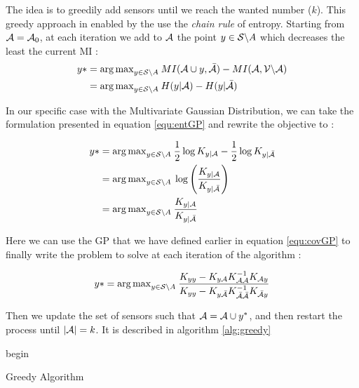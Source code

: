 \documentclass[12pt,twoside]{report}
\begin{document}
 
 The idea is to greedily add sensors until we reach the wanted number ($k$).   This greedy approach in enabled by the use the \textit{chain rule} of entropy.  Starting from $\A = \A_0$, at each iteration we add to $\A$ the point $y \in \S \backslash A $ which decreases the least the current MI : 
\begin{align}
	y* &= {\arg \max}_{y \in \S \backslash A } \: MI(\A \cup y, \bar{\A} ) - MI(\A, \VA) \\
	&= {\arg \max}_{y \in \S \backslash A } \: H(y | \A ) - H(y | \bar{\A} )
\end{align}

In our specific case with the Multivariate Gaussian Distribution, we can take the formulation presented in equation \ref{equ:entGP} and rewrite the objective to : 

\begin{align}
	y*  &= {\arg \max}_{y \in \S \backslash A } \: \frac{1}{2} \log K_{y | \A} - \frac{1}{2} \log K_{y | \bar{\A}} \\
	&= {\arg \max}_{y \in \S \backslash A } \: \log \left(\frac{K_{y | \A}}{K_{y | \bar{\A}}} \right) \\
	&= {\arg \max}_{y \in \S \backslash A } \: \frac{K_{y | \A}}{K_{y | \bar{\A}}}
\end{align}

Here we can use the GP that we have defined earlier in equation \ref{equ:covGP} to finally write the problem to solve at each iteration of the algorithm : 

\begin{equation}
	y*  = {\arg \max}_{y \in \S \backslash A } \: \frac{K_{yy} - K_{y\A} K_{\A\A}^{-1} K_{\A y} }{K_{yy} - K_{y\bar{\A}} K_{\bar{\A}\bar{\A}}^{-1} K_{\bar{\A} y} } \label{equ:updateGreedy}
\end{equation}

Then we update the set of sensors such that $\A = \A \cup y^*$, and then restart the process until $|\A| = k$. It is described in algorithm \ref{alg:greedy}  \\

\begin{algorithm}[h]
 begin\;
 \caption{Greedy Algorithm}
 \label{alg:greedy}
\end{algorithm}
\end{document}
